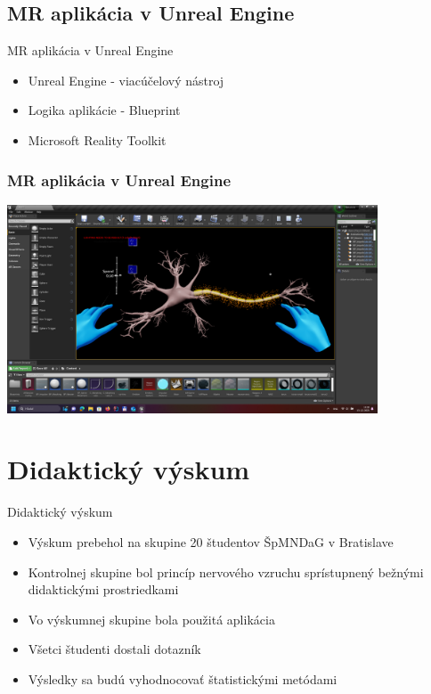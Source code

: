 \documentclass[pdf]{beamer}
\begin{document}
\subsection{MR aplikácia v Unreal Engine}
\begin{frame}{MR aplikácia v Unreal Engine}
    \begin{itemize}
        \item Unreal Engine - viacúčelový nástroj
        \item Logika aplikácie - Blueprint        
        \item Microsoft Reality Toolkit
    \end{itemize}
\end{frame}

\begin{frame}
    \frametitle{MR aplikácia v Unreal Engine}
    \begin{center}
        \includegraphics[width=11cm]{img/unreal.png}
    \end{center}
\end{frame}

\section{Didaktický výskum}
\begin{frame}{Didaktický výskum}
    \begin{itemize}
        \item Výskum prebehol na skupine 20 študentov ŠpMNDaG v Bratislave
        \item Kontrolnej skupine bol princíp nervového vzruchu sprístupnený bežnými didaktickými prostriedkami
        \item Vo výskumnej skupine bola použitá aplikácia
        \item Všetci študenti dostali dotazník
        \item Výsledky sa budú vyhodnocovať štatistickými metódami
    \end{itemize}    
\end{frame}
 
\end{document}
